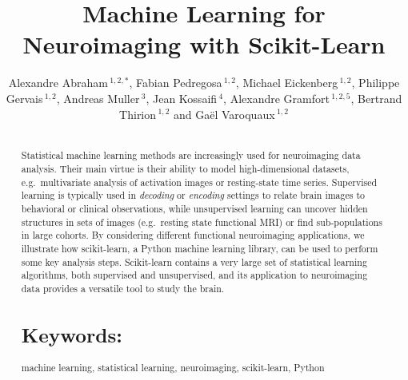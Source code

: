 \documentclass{frontiersSCNS} %
\def\firstAuthorLast{Alexandre Abraham {et~al}} %
\def\Authors{
    Alexandre Abraham\,$^{1,2,*}$,
    Fabian Pedregosa\,$^{1,2}$,
    Michael Eickenberg\,$^{1,2}$,
    Philippe Gervais\,$^{1,2}$,
    Andreas Muller\,$^{3}$,
    Jean Kossaifi\,$^{4}$,
    Alexandre Gramfort\,$^{1,2,5}$,
    Bertrand Thirion\,$^{1,2}$
    and Ga\"el Varoquaux\,$^{1,2}$}
\begin{document}
\onecolumn
{}

\title[Machine Learning for Neuroimaging with Scikit-Learn]{Machine Learning for Neuroimaging with Scikit-Learn}
\author[\firstAuthorLast ]{\Authors}
\address{}
\correspondance{}
\editor{}

\maketitle
\begin{abstract}

\section{}
Statistical machine learning methods are increasingly used for
neuroimaging data analysis. Their main virtue 
is their ability to model high-dimensional datasets, e.g.\ multivariate
analysis of activation images or resting-state time series.
Supervised learning is typically used in \emph{decoding} or
\emph{encoding} settings to relate
brain images to behavioral or clinical observations, while
unsupervised learning can uncover hidden structures in
sets of images (e.g.\ resting state functional MRI) or find
sub-populations in large cohorts. By considering
different functional neuroimaging applications, we illustrate how scikit-learn,
a Python machine learning library, can be used to perform some key
analysis steps. Scikit-learn contains a very large set of statistical
learning algorithms, both supervised and unsupervised, and its
application to neuroimaging data provides a versatile tool to study the
brain.


\tiny
\section{Keywords:} machine learning, statistical learning, neuroimaging,
scikit-learn, Python
\end{abstract}
\end{document}
